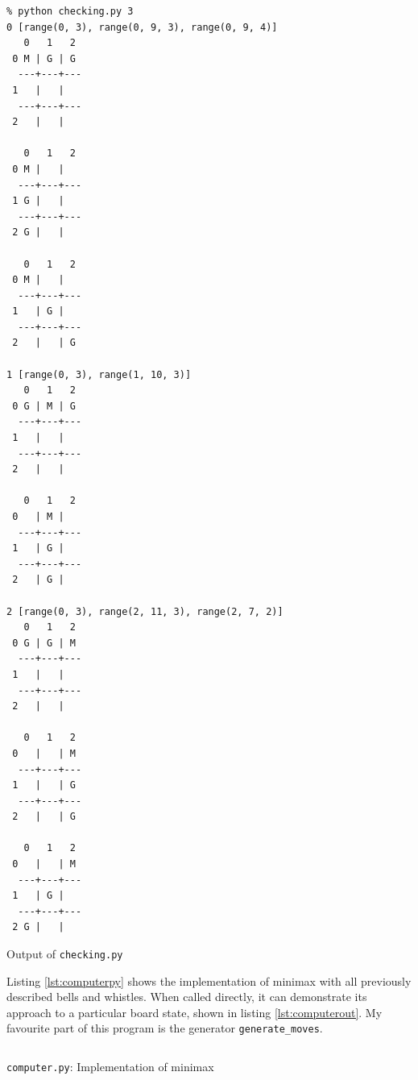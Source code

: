 \documentclass[a4paper,11pt]{article}
\newenvironment{longlisting}
{\addvspace{\baselineskip}\captionsetup{type=listing}}
{\addvspace{\baselineskip}}
\begin{document}
\begin{longlisting}
\begin{verbatim}
% python checking.py 3
0 [range(0, 3), range(0, 9, 3), range(0, 9, 4)]
   0   1   2
 0 M | G | G 
  ---+---+---
 1   |   |   
  ---+---+---
 2   |   |   

   0   1   2
 0 M |   |   
  ---+---+---
 1 G |   |   
  ---+---+---
 2 G |   |   

   0   1   2
 0 M |   |   
  ---+---+---
 1   | G |   
  ---+---+---
 2   |   | G 

1 [range(0, 3), range(1, 10, 3)]
   0   1   2
 0 G | M | G 
  ---+---+---
 1   |   |   
  ---+---+---
 2   |   |   

   0   1   2
 0   | M |   
  ---+---+---
 1   | G |   
  ---+---+---
 2   | G |   

2 [range(0, 3), range(2, 11, 3), range(2, 7, 2)]
   0   1   2
 0 G | G | M 
  ---+---+---
 1   |   |   
  ---+---+---
 2   |   |   

   0   1   2
 0   |   | M 
  ---+---+---
 1   |   | G 
  ---+---+---
 2   |   | G 

   0   1   2
 0   |   | M 
  ---+---+---
 1   | G |   
  ---+---+---
 2 G |   |   
\end{verbatim}
\caption{Output of \texttt{checking.py}}\label{lst:checkingout}
\end{longlisting}

    Listing \ref{lst:computerpy} shows the implementation of minimax with all
    previously described bells and whistles. When called directly, it can
    demonstrate its approach to a particular board state, shown in listing
    \ref{lst:computerout}. My favourite part of this program is the generator
    \texttt{generate\_moves}.

\begin{longlisting}
\inputminted{python}{../src/computer.py}
\caption{\texttt{computer.py}: Implementation of minimax}
\label{lst:computerpy}
\end{longlisting}
\end{document}
